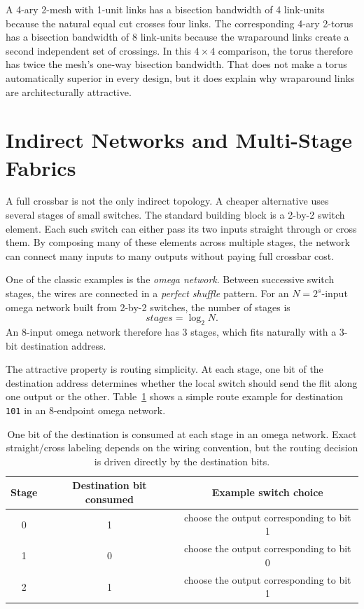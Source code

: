 A 4-ary 2-mesh with 1-unit links has a bisection bandwidth of 4 link-units because the natural equal cut crosses four links.
The corresponding 4-ary 2-torus has a bisection bandwidth of 8 link-units because the wraparound links create a second independent set of crossings.
In this $4\times4$ comparison, the torus therefore has twice the mesh's one-way bisection bandwidth.
That does not make a torus automatically superior in every design, but it does explain why wraparound links are architecturally attractive.



\section{Indirect Networks and Multi-Stage Fabrics}\label{sec:pin-multistage}
A full crossbar is not the only indirect topology.
A cheaper alternative uses several stages of small switches.
The standard building block is a 2-by-2 switch element.
Each such switch can either pass its two inputs straight through or cross them.
By composing many of these elements across multiple stages, the network can connect many inputs to many outputs without paying full crossbar cost.

One of the classic examples is the \textit{omega network}.
Between successive switch stages, the wires are connected in a \textit{perfect shuffle} pattern.
For an $N=2^s$-input omega network built from 2-by-2 switches, the number of stages is
\begin{equation}\label{eq:ch10-formula-omega-stages}
    stages=\log_2 N.
\end{equation}
An 8-input omega network therefore has 3 stages, which fits naturally with a 3-bit destination address.

The attractive property is routing simplicity.
At each stage, one bit of the destination address determines whether the local switch should send the flit along one output or the other.
Table~\ref{tab:pin-omega-route} shows a simple route example for destination \texttt{101} in an 8-endpoint omega network.
\begin{table}[t]
    \centering
    \renewcommand{\arraystretch}{1.15}
    \begin{tabular}{|c|c|c|}
        \hline
        Stage & Destination bit consumed & Example switch choice                    \\
        \hline
        0     & 1                        & choose the output corresponding to bit 1 \\
        1     & 0                        & choose the output corresponding to bit 0 \\
        2     & 1                        & choose the output corresponding to bit 1 \\
        \hline
    \end{tabular}
    \caption{One bit of the destination is consumed at each stage in an omega network. Exact straight/cross labeling depends on the wiring convention, but the routing decision is driven directly by the destination bits.}
    \label{tab:pin-omega-route}
\end{table}

